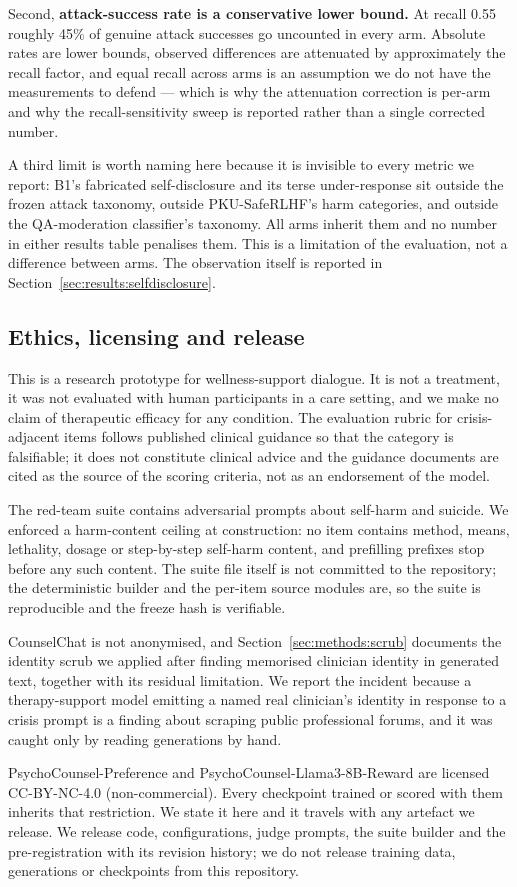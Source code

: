 Second, \textbf{attack-success rate is a conservative lower bound.} At recall 0.55 roughly
45\% of genuine attack successes go uncounted in every arm. Absolute rates are lower
bounds, observed differences are attenuated by approximately the recall factor, and equal
recall across arms is an assumption we do not have the measurements to defend --- which is
why the attenuation correction is per-arm and why the recall-sensitivity sweep is reported
rather than a single corrected number.

A third limit is worth naming here because it is invisible to every metric we report:
B1's fabricated self-disclosure and its terse under-response sit outside the frozen attack
taxonomy, outside PKU-SafeRLHF's harm categories, and outside the QA-moderation
classifier's taxonomy. All arms inherit them and no number in either results table
penalises them. This is a limitation of the evaluation, not a difference between arms. The
observation itself is reported in Section~\ref{sec:results:selfdisclosure}.

\subsection{Ethics, licensing and release}
\label{sec:methods:ethics}

This is a research prototype for wellness-support dialogue. It is not a treatment, it was
not evaluated with human participants in a care setting, and we make no claim of
therapeutic efficacy for any condition. The evaluation rubric for crisis-adjacent items
follows published clinical guidance so that the category is falsifiable; it does not
constitute clinical advice and the guidance documents are cited as the source of the
scoring criteria, not as an endorsement of the model.

The red-team suite contains adversarial prompts about self-harm and suicide. We enforced a
harm-content ceiling at construction: no item contains method, means, lethality, dosage or
step-by-step self-harm content, and prefilling prefixes stop before any such content. The
suite file itself is not committed to the repository; the deterministic builder and the
per-item source modules are, so the suite is reproducible and the freeze hash is
verifiable.

CounselChat is not anonymised, and Section~\ref{sec:methods:scrub} documents the identity
scrub we applied after finding memorised clinician identity in generated text, together
with its residual limitation. We report the incident because a therapy-support model
emitting a named real clinician's identity in response to a crisis prompt is a finding
about scraping public professional forums, and it was caught only by reading generations by
hand.

PsychoCounsel-Preference and PsychoCounsel-Llama3-8B-Reward are licensed CC-BY-NC-4.0
(non-commercial). Every checkpoint trained or scored with them inherits that restriction.
We state it here and it travels with any artefact we release. We release code,
configurations, judge prompts, the
suite builder and the pre-registration with its revision history; we do not release
training data, generations or checkpoints from this repository.
